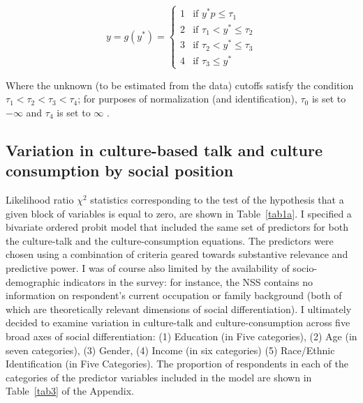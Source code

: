 \documentclass[11pt]{article}
\begin{document}
\begin{equation}
y=g(y^{*})=\left\{\begin{array}{rl}
  1 &\mbox{if $y^{*}p \leq \tau_{1}$} \\
  2 &\mbox{if $\tau_{1} < y^{*} \leq \tau_{2}$}\\ 
  3 &\mbox{if $\tau_{2} < y^{*} \leq \tau_{3}$}\\ 
  4 &\mbox{if $\tau_{3} \leq y^{*}$} 
 \end{array} \right.
 \label{eq3}
\end{equation}

Where the unknown (to be estimated from the data) cutoffs satisfy the condition $\tau_{1}<\tau_{2}<\tau_{3}<\tau_{4}$; for purposes of normalization (and identification), $\tau_{0}$ is set to $-\infty$ and $\tau_{4}$ is set to $\infty$ \citep{long_freese06}.

\subsection{Variation in culture-based talk and culture consumption by social position}
Likelihood ratio $\chi^{2}$ statistics corresponding to the test of the hypothesis that a given block of variables is equal to zero, are shown in Table~\ref{tab1a}.  I specified a bivariate ordered probit model that included the same set of predictors for both the culture-talk and the culture-consumption equations. The predictors were chosen  using a combination of criteria geared towards substantive relevance and predictive power. I was of course also limited by the availability of socio-demographic indicators in the survey: for instance, the NSS contains no information on respondent's current occupation or family background (both of which are theoretically relevant dimensions of social differentiation). I ultimately decided to examine variation in culture-talk and culture-consumption across five broad axes of social differentiation: (1) Education (in Five categories), (2) Age (in seven categories), (3) Gender, (4) Income (in six categories) (5) Race/Ethnic Identification (in Five Categories). The proportion of respondents in each of the categories of the predictor variables included in the model are shown in Table~\ref{tab3} of the Appendix. 
\end{document}
